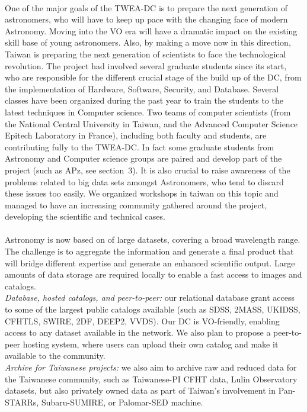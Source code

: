 \documentclass[11pt,twoside]{article}
\begin{document}
\\
One of the major goals of the TWEA-DC is to prepare the next generation of astronomers, who will have to keep up pace with the changing face of modern Astronomy. Moving into the VO era will have a dramatic impact on the existing skill base of young astronomers. Also, by making a move now in this direction, Taiwan is preparing the next generation of scientists to face the technological revolution. The project had involved several graduate students since its start, who are responsible for the different crucial stage of the build up of the DC, from the implementation of Hardware, Software, Security, and Database. Several classes have been organized during the past year to train the students to the latest techniques in Computer science. Two teams of computer scientists (from the National Central University in Taiwan, and the Advanced Computer Science Epitech Laboratory in France), including both faculty and students, are contributing fully to the TWEA-DC. In fact some graduate students from Astronomy and Computer science groups are paired and develop part of the project (such as APz, see section~3).
It is also crucial to raise awareness of the problems related to big data sets amongst Astronomers, who tend to discard these issues too easily. We organized workshops in taiwan on this topic and managed to have an increasing community gathered around the project, developing the scientific and technical cases.\\

\\
Astronomy is now based on of large datasets, covering a broad wavelength range. The challenge is to aggregate the information and generate a final product that will bridge different expertise and generate an enhanced scientific output. Large amounts of data storage are required locally to enable a fast access to images and catalogs.  \\ 
{\it Database, hosted catalogs, and peer-to-peer:} our relational database grant access to some of the largest public catalogs available (such as SDSS, 2MASS, UKIDSS, CFHTLS, SWIRE, 2DF, DEEP2, VVDS). Our DC is VO-friendly, enabling access to any dataset available in the network. We also plan to propose a peer-to-peer hosting system, where users can upload their own catalog and make it available to the community.\\
{\it Archive for Taiwanese projects:} we also aim to archive raw and reduced data for the Taiwanese community, such as Taiwanese-PI CFHT data, Lulin Observatory datasets, but also privately owned data as part of Taiwan's involvement in Pan-STARRs, Subaru-SUMIRE, or Palomar-SED machine.\\
\end{document}
